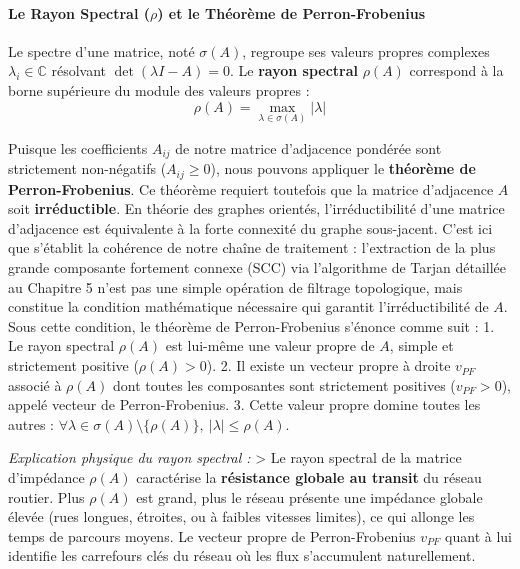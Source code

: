 \documentclass[10pt, a4paper]{article}
\begin{document}
\paragraph{\texorpdfstring{Le Rayon Spectral (\(\rho\)) et le Théorème
de
Perron-Frobenius}{Le Rayon Spectral (\textbackslash rho) et le Théorème de Perron-Frobenius}}\label{le-rayon-spectral-rho-et-le-thuxe9oruxe8me-de-perron-frobenius}

Le spectre d'une matrice, noté \(\sigma(A)\), regroupe ses valeurs
propres complexes \(\lambda_i \in \mathbb{C}\) résolvant
\(\det(\lambda I - A) = 0\). Le \textbf{rayon spectral} \(\rho(A)\)
correspond à la borne supérieure du module des valeurs propres :
\[\rho(A) = \max_{\lambda \in \sigma(A)} |\lambda|\]

Puisque les coefficients \(A_{ij}\) de notre matrice d'adjacence
pondérée sont strictement non-négatifs (\(A_{ij} \ge 0\)), nous pouvons
appliquer le \textbf{théorème de Perron-Frobenius}. Ce théorème requiert
toutefois que la matrice d'adjacence \(A\) soit \textbf{irréductible}.
En théorie des graphes orientés, l'irréductibilité d'une matrice
d'adjacence est équivalente à la forte connexité du graphe sous-jacent.
C'est ici que s'établit la cohérence de notre chaîne de traitement :
l'extraction de la plus grande composante fortement connexe (SCC) via
l'algorithme de Tarjan détaillée au Chapitre 5 n'est pas une simple
opération de filtrage topologique, mais constitue la condition
mathématique nécessaire qui garantit l'irréductibilité de \(A\). Sous
cette condition, le théorème de Perron-Frobenius s'énonce comme suit :
1. Le rayon spectral \(\rho(A)\) est lui-même une valeur propre de
\(A\), simple et strictement positive (\(\rho(A) > 0\)). 2. Il existe un
vecteur propre à droite \(v_{PF}\) associé à \(\rho(A)\) dont toutes les
composantes sont strictement positives (\(v_{PF} > 0\)), appelé vecteur
de Perron-Frobenius. 3. Cette valeur propre domine toutes les autres :
\(\forall \lambda \in \sigma(A) \setminus \{\rho(A)\}, \ |\lambda| \le \rho(A)\).

\emph{Explication physique du rayon spectral :} \textgreater{} Le rayon
spectral de la matrice d'impédance \(\rho(A)\) caractérise la
\textbf{résistance globale au transit} du réseau routier. Plus
\(\rho(A)\) est grand, plus le réseau présente une impédance globale
élevée (rues longues, étroites, ou à faibles vitesses limites), ce qui
allonge les temps de parcours moyens. Le vecteur propre de
Perron-Frobenius \(v_{PF}\) quant à lui identifie les carrefours clés du
réseau où les flux s'accumulent naturellement.
\end{document}
